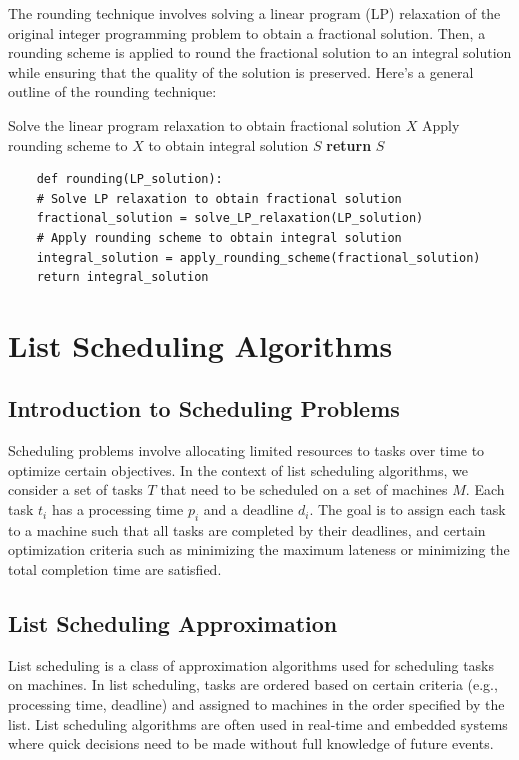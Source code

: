 \documentclass[12pt]{book} %
\begin{document}
The rounding technique involves solving a linear program (LP) relaxation of the original integer programming problem to obtain a fractional solution. Then, a rounding scheme is applied to round the fractional solution to an integral solution while ensuring that the quality of the solution is preserved. Here's a general outline of the rounding technique:
\FloatBarrier
\begin{algorithm}
\caption{Rounding Algorithm}\label{alg:rounding}
\begin{algorithmic}[1]
\State Solve the linear program relaxation to obtain fractional solution $X$
\State Apply rounding scheme to $X$ to obtain integral solution $S$
\State \textbf{return} $S$
\EndProcedure
\end{algorithmic}
\end{algorithm}
\FloatBarrier
\begin{lstlisting}
    def rounding(LP_solution):
    # Solve LP relaxation to obtain fractional solution
    fractional_solution = solve_LP_relaxation(LP_solution)
    # Apply rounding scheme to obtain integral solution
    integral_solution = apply_rounding_scheme(fractional_solution)
    return integral_solution
\end{lstlisting}


\section{List Scheduling Algorithms}

\subsection{Introduction to Scheduling Problems}
Scheduling problems involve allocating limited resources to tasks over time to optimize certain objectives. In the context of list scheduling algorithms, we consider a set of tasks \(T\) that need to be scheduled on a set of machines \(M\). Each task \(t_i\) has a processing time \(p_i\) and a deadline \(d_i\). The goal is to assign each task to a machine such that all tasks are completed by their deadlines, and certain optimization criteria such as minimizing the maximum lateness or minimizing the total completion time are satisfied.

\subsection{List Scheduling Approximation}
List scheduling is a class of approximation algorithms used for scheduling tasks on machines. In list scheduling, tasks are ordered based on certain criteria (e.g., processing time, deadline) and assigned to machines in the order specified by the list. List scheduling algorithms are often used in real-time and embedded systems where quick decisions need to be made without full knowledge of future events.
\end{document}
